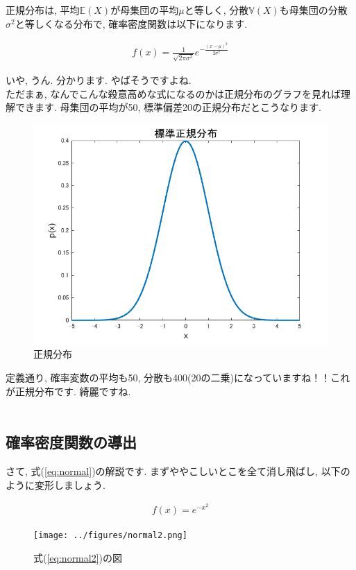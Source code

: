 \documentclass[11pt,a4paper,uplatex]{ujreport} 	%
\begin{document}
正規分布は, 平均$\mathbb{E}(X)$が母集団の平均$μ$と等しく, 分散$\mathbb{V}(X)$も母集団の分散$\sigma ^2$と等しくなる分布で, 確率密度関数は以下になります.

\begin{align}
\label{eq:normal}
f(x) = \frac{1}{\sqrt{2\pi\sigma^2}}e^{-\frac{(x-\mu)^2}{2\sigma^2}}
\end{align}

いや, うん. 分かります. やばそうですよね. \\

ただまぁ, なんでこんな殺意高めな式になるのかは正規分布のグラフを見れば理解できます. 母集団の平均が50, 標準偏差20の正規分布だとこうなります.

\begin{figure}[H]
\label{im:normal}
  \centering
  \includegraphics[width=120mm,bb=0 0 432 288]{../figures/normal.png}
  \caption{正規分布}
\end{figure}

定義通り, 確率変数の平均も50, 分散も400(20の二乗)になっていますね！！これが正規分布です. 綺麗ですね.\\
\\
\subsection{確率密度関数の導出}
さて, 式(\ref{eq:normal})の解説です. まずややこしいとこを全て消し飛ばし, 以下のように変形しましょう. 

\begin{align}
\label{eq:normal2}
f(x) = e^{-x^2}
\end{align}

\begin{figure}[H]
\label{im:normal}
  \centering
  \texttt{[image: ../figures/normal2.png]}
  \caption{式(\ref{eq:normal2})の図}
\end{figure}
\end{document}
